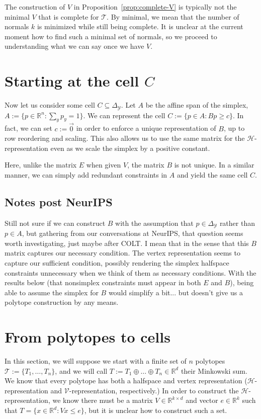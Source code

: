 \documentclass[12pt]{article}
\newcommand{\reals}{\mathbb{R}}
\newcommand{\simplex}{\Delta_\Y}
\renewcommand{\H}{\mathcal{H}}
\newcommand{\T}{\mathcal{T}}
\newcommand{\V}{\mathcal{V}}
\newcommand{\Y}{\mathcal{Y}}
\begin{document}
  The construction of $V$ in Proposition~\ref{prop:complete-V} is typically not the minimal $V$ that is complete for $\T$.
  By minimal, we mean that the number of normals $k$ is minimized while still being complete.
  It is unclear at the current moment how to find such a minimal set of normals, so we proceed to understanding what we can say once we have $V$.
  \fi
  
  \section{Starting at the cell $C$}\label{sec:start-cell}
  
  Now let us consider some cell $C \subseteq \simplex$.
  Let $A$ be the affine span of the simplex, $A := \{p \in \reals^n : \sum_y p_y = 1\}$.
  We can represent the cell $C := \{p \in A : Bp \geq c\}$.
  In fact, we can set $c := \vec 0$ in order to enforce a unique representation of $B$, up to row reordering and scaling.
  This also allows us to use the same matrix for the $\H$-representation even as we scale the simplex by a positive constant.
  
  Here, unlike the matrix $E$ when given $V$, the matrix $B$ is not unique.
  In a similar manner, we can simply add redundant constraints in $A$ and yield the same cell $C$.
  
  \subsection{Notes post NeurIPS} 
  Still not sure if we can construct $B$ with the assumption that $p \in \simplex$ rather than $p \in A$, but gathering from our conversations at NeurIPS, that question seems worth investigating, just maybe after COLT.
  I mean that in the sense that this $B$ matrix captures our necessary condition.
  The vertex representation seems to capture our sufficient condition, possibly rendering the simplex halfspace constraints unnecessary when we think of them as necessary conditions.
  With the results below (that nonsimplex constraints must appear in both $E$ and $B$), being able to assume the simplex for $B$ would simplify a bit... but doesn't give us a polytope construction by any means.

  \section{From polytopes to cells}\label{sec:start-polytope}
  In this section, we will suppose we start with a finite set of $n$ polytopes $\T := \{T_1, \ldots, T_n\}$, and we will call $T := T_1 \oplus \ldots \oplus T_n \in \reals^d$ their Minkowski sum.
  We know that every polytope has both a halfspace and vertex representation ($\H$-representation and $\V$-representation, respectively.)
  In order to construct the $\H$-representation, we know there must be a matrix $V \in \reals^{k \times d}$ and vector $e \in \reals^k$ such that $T = \{x \in \reals^d : Vx \leq e\}$, but it is unclear how to construct such a set.
  
\end{document}
